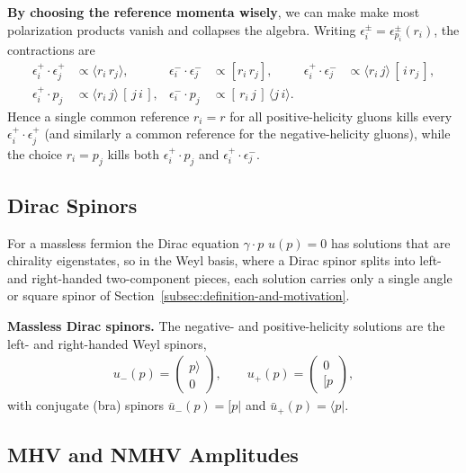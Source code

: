 \textbf{By choosing the reference momenta wisely}, we can make make most polarization products vanish and collapses the algebra. Writing $\epsilon_i^{\pm} = \epsilon_{p_i}^{\pm}(r_i)$, the contractions are
\begin{align*}
	\epsilon_i^{+}\cdot \epsilon_j^{+} &\propto \langle r_i\, r_j\rangle, &
	\epsilon_i^{-}\cdot \epsilon_j^{-} &\propto [r_i\, r_j], &
	\epsilon_i^{+}\cdot \epsilon_j^{-} &\propto \langle r_i\, j\rangle\,[\,i\, r_j\,], \\
	\epsilon_i^{+}\cdot p_j &\propto \langle r_i\, j\rangle\,[\,j\, i\,], &
	\epsilon_i^{-}\cdot p_j &\propto [\,r_i\, j\,]\,\langle j\, i\rangle. &&
\end{align*}
Hence a single common reference $r_i = r$ for all positive-helicity gluons kills every $\epsilon_i^{+}\cdot \epsilon_j^{+}$ (and similarly a common reference for the negative-helicity gluons), while the choice $r_i = p_j$ kills both $\epsilon_i^{+}\cdot p_j$ and $\epsilon_i^{+}\cdot \epsilon_j^{-}$.

\subsection{Dirac Spinors}
\label{subsec:dirac-spinors}

For a massless fermion the Dirac equation $\gamma\cdot p\,\, u(p) = 0$ has solutions that are chirality eigenstates, so in the Weyl basis, where a Dirac spinor splits into left- and right-handed two-component pieces, each solution carries only a single angle or square spinor of Section~\ref{subsec:definition-and-motivation}.

\textbf{Massless Dirac spinors.} The negative- and positive-helicity solutions are the left- and right-handed Weyl spinors,
\begin{align}
	\label{eq:massless-dirac-spinors}
	u_-(p) = \begin{pmatrix} p\rangle \\ 0 \end{pmatrix},
	\qquad
	u_+(p) = \begin{pmatrix} 0 \\ [p \end{pmatrix},
\end{align}
with conjugate (bra) spinors $\bar u_-(p) = [p|$ and $\bar u_+(p) = \langle p|$. 

\subsection{MHV and NMHV Amplitudes}
\label{sec:mhv-amplitudes}


